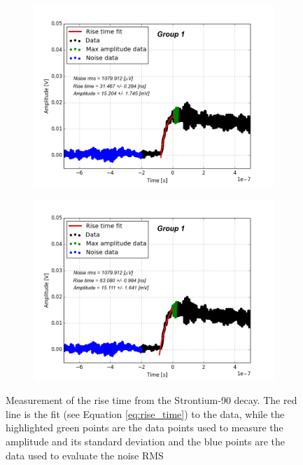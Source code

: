 \documentclass[12pt]{article}
\begin{document}
\begin{figure}[h!!]
\begin{subfigure}[t]{0.45\textwidth}
    \includegraphics[width=1.1\textwidth]{./graphics/data_10.png}
  \end{subfigure}
  \hfill
  \begin{subfigure}[t]{0.45\textwidth}
    \centering
    \includegraphics[width=1.1\textwidth]{./graphics/data_11.png}
  \end{subfigure}
\caption{Measurement of the rise time from the Strontium-90 decay. The red line is the fit (see Equation \ref{eq:rise_time}) to the data, while the highlighted green points are the data points used to measure the amplitude and its standard deviation and the blue points are the data used to evaluate the noise RMS}
\label{fig:rise_time_measurement_2}
\end{figure}
\end{document}
